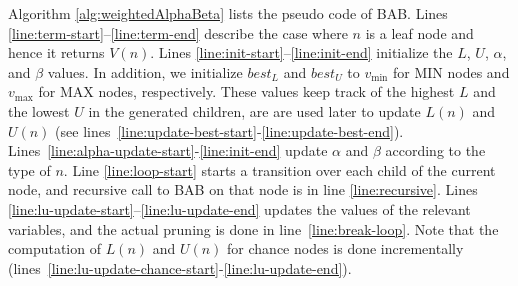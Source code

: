 \documentclass[letterpaper]{article} %
\newcommand{\MM}{\mathit{V}}
\newcommand{\pess}{\mathit{L}}
\newcommand{\opti}{\mathit{U}}
\newcommand{\besto}{\mathit{best}_{\opti}}
\newcommand{\bestp}{\mathit{best}_{\pess}}
\newcommand{\vmax}{v_{\text{max}}}
\newcommand{\vmin}{v_{\text{min}}}
\newcommand{\rootnode}{\mathit{root}}
\begin{document}
Algorithm \ref{alg:weightedAlphaBeta} lists the pseudo code of BAB. %
Lines \ref{line:term-start}--\ref{line:term-end} describe the case where $n$ is a leaf node and hence it returns $\MM(n)$. %
Lines \ref{line:init-start}--\ref{line:init-end} initialize the $\pess$, $\opti$, $\alpha$, and $\beta$ values. In addition, we 
initialize $\bestp$ and $\besto$ to $\vmin{}$ for MIN nodes and $\vmax{}$ for MAX nodes, respectively. These values keep track of the highest $\pess{}$ and the lowest $\opti{}$ in the generated children, are are used later to update $\pess(n)$ and $\opti(n)$ (see lines~\ref{line:update-best-start}-\ref{line:update-best-end}). 
Lines~\ref{line:alpha-update-start}-\ref{line:init-end} update $\alpha$ and $\beta$ according to the type of $n$. 
Line \ref{line:loop-start} starts a transition over each child of the current node, and recursive call to BAB on that node is 
in line \ref{line:recursive}. Lines \ref{line:lu-update-start}--\ref{line:lu-update-end} updates 
the values of the relevant variables, and the actual pruning is done in line~\ref{line:break-loop}. 
Note that the computation of $\pess(n)$ and $\opti(n)$ for chance nodes is done incrementally (lines~\ref{line:lu-update-chance-start}-\ref{line:lu-update-end}). 

\end{document}
